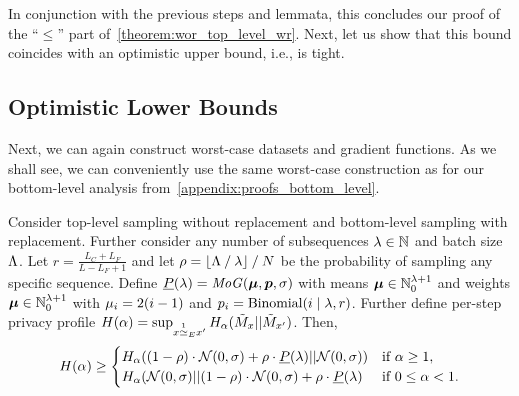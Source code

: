 In conjunction with the previous steps and lemmata, this concludes our proof of the ``$\leq$'' part of~\cref{theorem:wor_top_level_wr}.
Next, let us show that this bound coincides with an optimistic upper bound, i.e., is tight.

\subsection{Optimistic Lower Bounds}\label{appendix:bilevel_optimistic_lower_bounds}
Next, we can again construct worst-case datasets and gradient functions.
As we shall see, we can conveniently use the same worst-case construction as for our bottom-level analysis from~\cref{appendix:proofs_bottom_level}.
\begin{theorem}\label{theorem:wor_top_wr_bottom_upper}
    Consider top-level sampling without replacement and bottom-level sampling with replacement.
    Further consider any number of subsequences $\lambda \in {\mathbb{N}}$ and 
    batch size $\Lambda$.
    Let $r = \frac{L_C + L_F}{L - L_F + 1}$ and let 
    $\rho = \lfloor \Lambda \mathbin{/} \lambda \rfloor \mathbin{/} N$ be the probability of sampling any specific sequence. 
    Define
    $\underline{P}(\lambda) = \mathit{MoG}({\bm{\mu}}, {\bm{p}}, \sigma)$ with
    means ${\bm{\mu}} \in {\mathbb{N}}_0^{\lambda +1}$ and weights ${\bm{\mu}} \in {\mathbb{N}}_0^{\lambda +1}$
    with ${\mu}_i = 2 (i-1)$
    and ${p}_i = \mathrm{Binomial}(i \mid \lambda, r)$. Further define per-step privacy profile $H(\alpha) = \sup_{x \overset{1}{\simeq}_{E} x'} H_\alpha(\tilde{M}_x || \tilde{M}_{x'})$. Then, 
    \begin{equation*}
        H(\alpha) \geq 
        \begin{cases}
            H_\alpha((1 - \rho) \cdot \mathcal{N}(0,\sigma)  + \rho \cdot \underline{P}(\lambda) || \mathcal{N}(0,\sigma)) & \text{if } \alpha \geq 1,\\
            H_\alpha(\mathcal{N}(0,\sigma) || (1 - \rho) \cdot \mathcal{N}(0,\sigma)  + \rho \cdot \underline{P}(\lambda)  & \text{if } 0 \leq \alpha < 1.
        \end{cases}
    \end{equation*}
\end{theorem}
